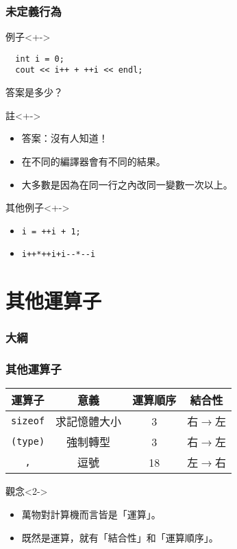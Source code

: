 \documentclass[utf8]{beamer}
\begin{document}
\begin{CJK}{UTF8}{bkai}
\begin{frame}[fragile]
  \frametitle{未定義行為}
  \begin{exampleblock}{例子}<+->
    \begin{lstlisting}
  int i = 0;
  cout << i++ + ++i << endl;
    \end{lstlisting}
    答案是多少？
  \end{exampleblock}
  \begin{block}{註}<+->
    \begin{itemize}
    \item 答案：\alert{沒有人知道！}
    \item<+-> 在不同的編譯器會有不同的結果。
    \item<+-> 大多數是因為在同一行之內改同一變數\alert{一次}以上。
    \end{itemize}
  \end{block}
  \begin{alertblock}{其他例子}<+->
    \begin{itemize}
    \item \lstinline{i = ++i + 1;}{}
    \item<+-> \lstinline{i++*++i+i--*--i}{}
    \end{itemize}
  \end{alertblock}
\end{frame}

\section{其他運算子}
\begin{frame}
  \frametitle{大綱}
  \begin{multicols}{2}
    \tableofcontents[currentsection]
  \end{multicols}
\end{frame}

\begin{frame}[fragile]
  \frametitle{其他運算子}
  \begin{table}[h]
    \begin{tabular}{|c|c|c|c|}
    \hline
    運算子                & 意義       & 運算順序 & 結合性\\
    \hline
    \lstinline{sizeof}{} & 求記憶體大小 & 3      & \alert{右$\rightarrow$左}\\
    \hline
    \lstinline{(type)}{} & 強制轉型    & 3      & \alert{右$\rightarrow$左}\\
    \hline
    \lstinline{,}{}      & 逗號       & 18      & 左$\rightarrow$右\\
    \hline
    \end{tabular}
  \end{table}
  \begin{alertblock}{觀念}<2->
    \begin{itemize}
    \item 萬物對計算機而言皆是「\alert{運算}」。
    \item<3-> 既然是運算，就有「結合性」和「運算順序」。
    \end{itemize}
  \end{alertblock}
\end{frame}


\end{CJK}
\end{document}
